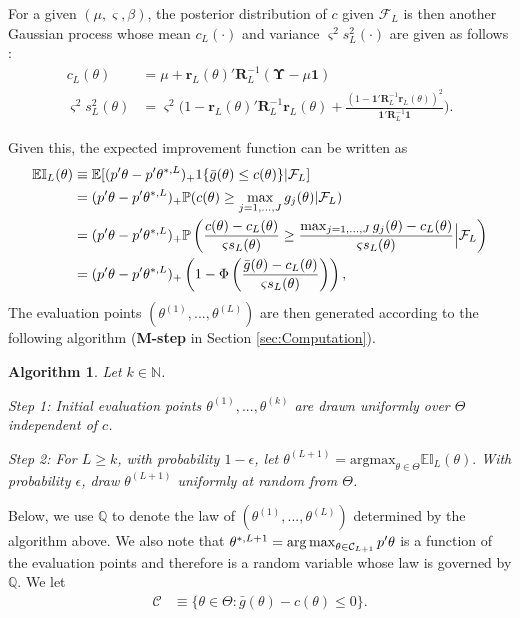 \documentclass[letterpaper,11pt]{article}
\theoremstyle{myplain}
\theoremstyle{mydefinition}
\newtheorem{algorithm}{Algorithm}[section]
\theoremstyle{myremark}
\def\argmax{\mathop{\rm arg\,max}}
\newcommand{\E}{\mathbb{E}}
\newcommand{\F}{\mathcal{F}}
\newcommand{\EI}{\mathbb{EI}}
\newcommand{\bP}{\mathbb{P}}
\newcommand{\bQ}{\mathbb Q}
\numberwithin{equation}{section}
\numberwithin{figure}{section}
\begin{document}
\begin{appendix}
For a given $(\mu,\varsigma,\beta)$, the posterior distribution of $c$ given $\mathcal F_L$ is then another Gaussian process whose mean $c_L(\cdot)$ and variance $\varsigma^2 s^2_L(\cdot)$ are given as follows \citep[][Section 4.1.3]{Santner:2013aa}:
\begin{align}
	c_L(\theta)&=\mu+\mathbf{r}_L(\theta)'\mathbf{R}_L^{-1}(\mathbf \Upsilon-\mu \mathbf 1)\\
	\varsigma^2s^2_L(\theta)&= \varsigma^2\biggl(1-\mathbf r_L(\theta)'\mathbf R_L^{-1}\mathbf r_L(\theta)+\frac{(1-\mathbf 1'\mathbf R_L^{-1}\mathbf r_L(\theta))^2}{\mathbf 1'\mathbf R_L^{-1}\mathbf 1}\biggr).
\end{align}


Given this, the expected improvement function can be written as
\begin{align}
\EI_L(\theta)&\equiv \E[(p'\theta-p'\theta^{*,L})_+1\{\bar g(\theta)\le c(\theta)\}|\F_L]\notag\\
&=(p'\theta-p'\theta^{*,L})_+\bP(c(\theta)\ge \max_{j=1,...,J}g_j(\theta)|\F_L)\notag\\
&=(p'\theta-p'\theta^{*,L})_+\bP\left(\frac{c(\theta)-c_L(\theta)}{\varsigma s_L(\theta)}\ge \frac{\max_{j=1,...,J}g_j(\theta)- c_L(\theta)}{\varsigma s_L(\theta)}\Big|\F_L\right)\notag\\
&=(p'\theta-p'\theta^{*,L})_+\left(1-\Phi\left(\frac{\bar g(\theta)-c_L(\theta)}{\varsigma s_L(\theta)}\right)\right),\label{eq:eidef}
\end{align}
The evaluation points $(\theta^{(1)},...,\theta^{(L)})$ are then generated according to the following algorithm (\textbf{M-step} in Section \ref{sec:Computation}).
\begin{algorithm}\label{alg:evalpts}
Let $k\in\mathbb N$.

\noindent
Step 1: Initial evaluation points $\theta^{(1)},...,\theta^{(k)}$ are drawn uniformly over $\Theta$  independent of $c$.

\noindent
Step 2: For $L\ge k$,	with probability $1-\epsilon$, let $\theta^{(L+1)}=\text{argmax}_{\theta\in\Theta}\EI_L(\theta).$ With probability $\epsilon$,  draw $\theta^{(L+1)}$  uniformly at random from $\Theta$.
\end{algorithm}
Below, we use  $\bQ$ to denote the law of $(\theta^{(1)},...,\theta^{(L)})$ determined by the algorithm above.
We also note that $\theta^{*,L+1}=\argmax_{\theta\in\mathcal C_{L+1}}p'\theta$ is a function of the evaluation points and therefore is a random variable whose law is governed by $\bQ$.
We let
\begin{align}
\mathcal C&\equiv\{\theta\in\Theta:\bar g(\theta)-c(\theta)\le 0\}. \label{eq:calc}
\end{align}


\end{appendix}
\end{document}
